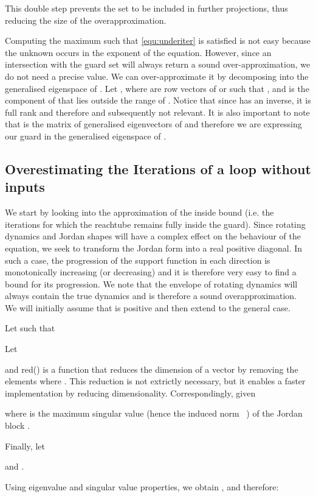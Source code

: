 \documentclass{IEEEtran}
\begin{document}
This double step prevents the set  to be included in further projections, thus reducing the size of the overapproximation. 

\medskip 
Computing the maximum  such that \eqref{equ:underiter} is satisfied is not easy 
because the unknown  occurs in the exponent of the equation.
However, since an intersection with the guard set will always return a
sound over-approximation, we do not need a precise value. We can over-approximate it by decomposing  into the generalised eigenspace of .
Let , 
where  are row vectors of  or  such that , 
and  is the component of  that lies outside the range of .  
Notice that since  has an inverse, it is full rank and therefore
 and subsequently not relevant.  It is also
important to note that  is the matrix of generalised eigenvectors
of  and therefore we are expressing our guard in the generalised
eigenspace of .


\subsection{Overestimating the Iterations of a loop without inputs} \label{sec:guards_noinputs}
We start by looking into the approximation of the inside bound (i.e. the iterations for which the
reachtube remains fully inside the guard). Since rotating dynamics and Jordan shapes will have
a complex effect on the behaviour of the equation, we seek to transform the Jordan form into a
real positive diagonal. In such a case, the progression of the support function in each direction
is monotonically increasing (or decreasing) and it is therefore very easy to find a bound for its 
progression. We note that the envelope of rotating dynamics will always contain the true
dynamics and is therefore a sound overapproximation. We will initially assume that 
 is positive and then extend to the general case.

Let  such that




Let


and red() is a function that reduces the dimension of a vector by removing the elements where . This reduction is not extrictly necessary, but it enables a faster implementation by reducing dimensionality.
Correspondingly, given 

where  is the maximum singular value (hence the induced norm ~\cite{LT84}) of the Jordan block .


Finally, let

and .

Using eigenvalue and singular value properties, we
obtain , and
therefore:
\end{document}
